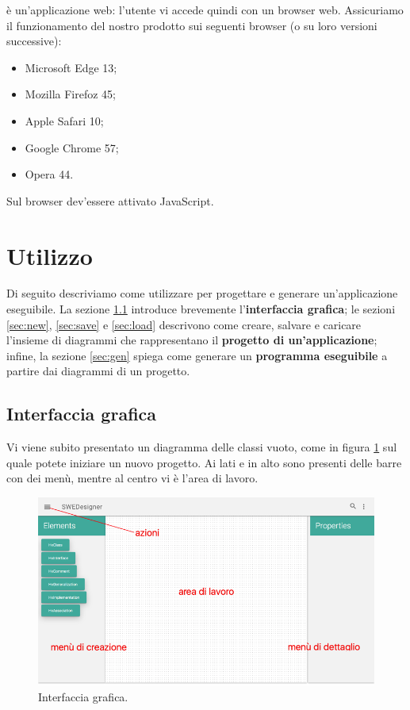 \proj{} è un'applicazione web: l'utente vi accede quindi con un browser web. Assicuriamo il funzionamento del nostro prodotto sui seguenti browser (o su loro versioni successive):
\begin{itemize} %
	\item Microsoft Edge 13;
	\item Mozilla Firefoz 45;
	\item Apple Safari 10;
	\item Google Chrome 57;
	\item Opera 44.
\end{itemize}
Sul browser dev'essere attivato JavaScript.






\section{Utilizzo} \label{sec:utilizzo} %

Di seguito descriviamo come utilizzare \proj{} per progettare e generare un'applicazione eseguibile. La sezione \ref{sec:gui} introduce brevemente l'\textbf{interfaccia grafica}; le sezioni \ref{sec:new}, \ref{sec:save} e \ref{sec:load} descrivono come creare, salvare e caricare l'insieme di diagrammi che rappresentano il \textbf{progetto di un'applicazione}; infine, la sezione \ref{sec:gen} spiega come generare un \textbf{programma eseguibile} a partire dai diagrammi di un progetto.



\subsection{Interfaccia grafica} \label{sec:gui}

Vi viene subito presentato un diagramma delle classi vuoto, come in figura \ref{fig:screen} sul quale potete iniziare un nuovo progetto. Ai lati e in alto sono presenti delle barre con dei menù, mentre al centro vi è l'area di lavoro.

\begin{figure}
\centering
	\includegraphics[scale=0.46]{img/screen_index_2}
	\caption{Interfaccia grafica.}
	\label{fig:screen}
\end{figure}



